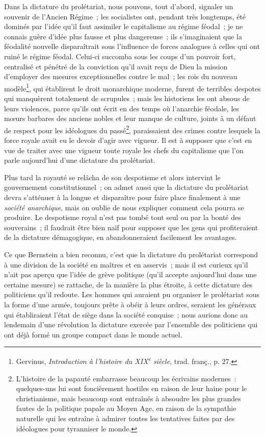 \documentclass[french,twoside]{book} %
\begin{document}
Dans la dictature du prolétariat, nous pouvons, tout d’abord, signaler un souvenir de l’Ancien Régime ; les socialistes ont, pendant très longtemps, été dominés par l’idée qu’il faut assimiler le capitalisme au régime féodal ; je ne connais guère d’idée plus fausse et plus dangereuse ; ils s’imaginaient que la féodalité nouvelle disparaîtrait sous l’influence de forces analogues à celles qui ont ruiné le régime féodal. Celui-ci succomba sous les coups d’un pouvoir fort, centralisé et pénétré de la conviction qu’il avait reçu de Dieu la mission d’employer des mesures exceptionnelles contre le mal ; les rois du nouveau  modèle\footnote{ \noindent Gervinus, \emph{Introduction à l’histoire du XIX\textsuperscript{e} siècle}, trad. franç., p. 27.
 }, qui établirent le droit monarchique moderne, furent de terribles despotes qui manquèrent totalement de scrupules ; mais les historiens les ont absous de leurs violences, parce qu’ils ont écrit en des temps où l’anarchie féodale, les mœurs barbares des anciens nobles et leur manque de culture, joints à un défaut de respect pour les idéologues du passé\footnote{ \noindent L’histoire de la papauté embarrasse beaucoup les écrivains modernes : quelques-uns lui sont foncièrement hostiles en raison de leur haine pour le christianisme, mais beaucoup sont entraînés à absoudre les plus grandes fautes de la politique papale au Moyen Age, en raison de la sympathie naturelle qui les entraîne à admirer toutes les tentatives faites par des idéologues pour tyranniser le monde.
 }, paraissaient des crimes contre lesquels la force royale avait eu le devoir d’agir avec vigueur. Il est à supposer que c’est en vue de traiter avec une vigueur toute royale les chefs du capitalisme que l’on parle aujourd’hui d’une dictature du prolétariat.\par
Plus tard la royauté se relâcha de son despotisme et alors intervint le gouvernement constitutionnel ; on admet aussi que la dictature du prolétariat devra s’atténuer à la longue et disparaître pour faire place finalement à une \emph{société anarchique}, mais on oublie de nous expliquer comment cela pourra se produire. Le despotisme royal n’est pas tombé tout seul ou par la bonté des souverains ; il faudrait être bien naïf pour supposer que les gens qui profiteraient de la dictature démagogique, en abandonneraient facilement les avantages.\par
 Ce que Bernstein a bien reconnu, c’est que la dictature du prolétariat correspond à une division de la société en maîtres et en asservis ; mais il est curieux qu’il n’ait pas aperçu que l’idée de grève politique (qu’il accepte aujourd’hui dans une certaine mesure) se rattache, de la manière la plus étroite, à cette dictature des politiciens qu’il redoute. Les hommes qui auraient pu organiser le prolétariat sous la forme d’une armée, toujours prête à obéir à leurs ordres, seraient les généraux qui établiraient l’état de siège dans la société conquise ; nous aurions donc au lendemain d’une révolution la dictature exercée par l’ensemble des politiciens qui ont déjà formé un groupe compact dans le monde actuel.\par
\end{document}
